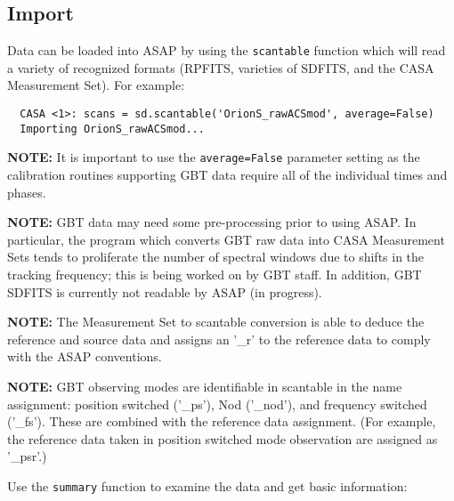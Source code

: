 \subsection{Import}
\label{subsection:sd.asap.import}

Data can be loaded into ASAP by using the {\tt scantable} function
which will read a variety of recognized formats (RPFITS, varieties of
SDFITS, and the CASA Measurement Set). For example:


\small
\begin{verbatim}
  CASA <1>: scans = sd.scantable('OrionS_rawACSmod', average=False)
  Importing OrionS_rawACSmod...
\end{verbatim}
\normalsize

{\bf NOTE:} It is important to use the {\tt average=False} parameter
setting as the calibration routines supporting GBT data require all of
the individual times and phases.

{\bf NOTE:} GBT data may need some pre-processing prior to using
ASAP. In particular, the program which converts GBT raw data into CASA
Measurement Sets tends to proliferate the number of spectral windows
due to shifts in the tracking frequency; this is being worked on by
GBT staff. In addition, GBT SDFITS is currently not readable by ASAP
(in progress).

{\bf NOTE:} The Measurement Set to scantable conversion is able to deduce
the reference and source data and assigns an '\_r' to the reference
data to comply with the ASAP conventions.

{\bf NOTE:} GBT observing modes are identifiable in scantable in the
name assignment: position switched ('\_ps'), Nod ('\_nod'), and
frequency switched ('\_fs'). These are combined with the reference data
assignment. (For example, the reference data taken in position
switched mode observation are assigned as '\_psr'.)

Use the {\tt summary} function to examine the data and get basic information:

